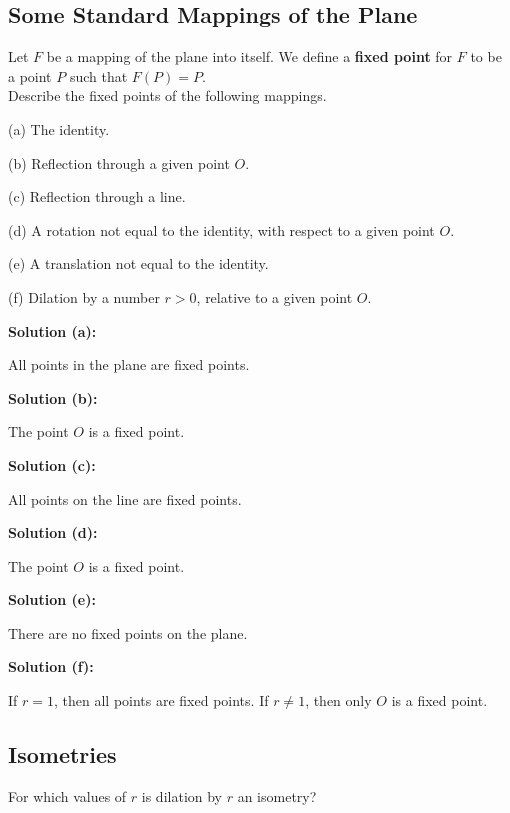 \subsection{Some Standard Mappings of the Plane}

\begin{tcolorbox}[title=Problem 1, breakable]
    Let $F$ be a mapping of the plane into itself.
    We define a \textbf{fixed point} for $F$ to be a 
        point $P$ such that $F(P) = P$. \\

    Describe the fixed points of the following mappings.

    (a) The identity.

    (b) Reflection through a given point $O$.

    (c) Reflection through a line.

    (d) A rotation not equal to the identity, with respect to a given point $O$.

    (e) A translation not equal to the identity.

    (f) Dilation by a number $r > 0$, relative to a given point $O$.
\end{tcolorbox}

\textbf{Solution (a):}

All points in the plane are fixed points.

\textbf{Solution (b):}

The point $O$ is a fixed point.

\textbf{Solution (c):}

All points on the line are fixed points.

\textbf{Solution (d):}

The point $O$ is a fixed point.

\textbf{Solution (e):}

There are no fixed points on the plane.

\textbf{Solution (f):}

If $r = 1$, then all points are fixed points.  
If $r \neq 1$, then only $O$ is a fixed point.

\subsection{Isometries}

\begin{tcolorbox}[title=Problem 2, breakable]
    For which values of $r$ is dilation by $r$ an isometry?
\end{tcolorbox}

